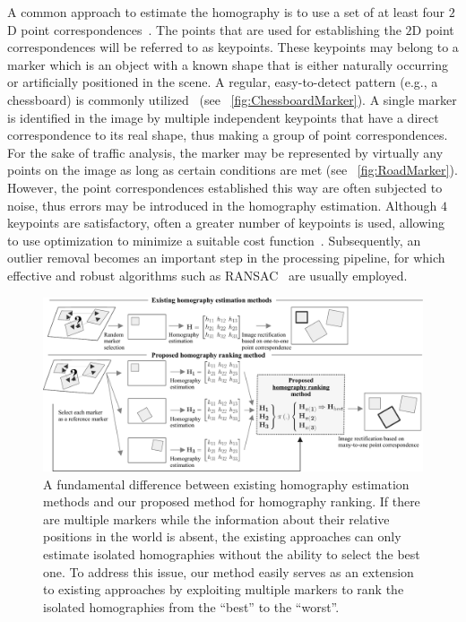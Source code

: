 A common approach to estimate the homography is to use a set of at least four $2$D point correspondences~\cite{hartley1997defense}. The points that are used for establishing the $2$D point correspondences will be referred to as keypoints. These keypoints may belong to a marker which is an object with a known shape that is either naturally occurring or artificially positioned in the scene. A regular, easy-to-detect pattern (e.g., a chessboard) is commonly utilized~\cite{zhang2016flexible} (see \figstr{}~\ref{fig:ChessboardMarker}). A single marker is identified in the image by multiple independent keypoints that have a direct correspondence to its real shape, thus making a group of point correspondences. For the sake of traffic analysis, the marker may be represented by virtually any points on the image as long as certain conditions are met (see \figstr{}~\ref{fig:RoadMarker}). However, the point correspondences established this way are often subjected to noise, thus errors may be introduced in the homography estimation. Although $4$ keypoints are satisfactory, often a greater number of keypoints is used, allowing to use optimization to minimize a suitable cost function~\cite{osuna2016multiobjective, mou2013robust}. Subsequently, an outlier removal becomes an important step in the processing pipeline, for which effective and robust algorithms such as RANSAC~\cite{fischler1981ransac} are usually employed.

\begin{figure}[t]
    \centerline{\includegraphics[width=\linewidth]{figures/homography/motivation_diagram.pdf}}
    \caption[Homography ranking motivation diagram]{A fundamental difference between existing homography estimation methods and our proposed method for homography ranking. If there are multiple markers while the information about their relative positions in the world is absent, the existing approaches can only estimate isolated homographies without the ability to select the best one. To address this issue, our method easily serves as an extension to existing approaches by exploiting multiple markers to rank the isolated homographies from the ``best'' to the ``worst''.}
    \label{fig:HomographyMotivationDiagram}
\end{figure}

